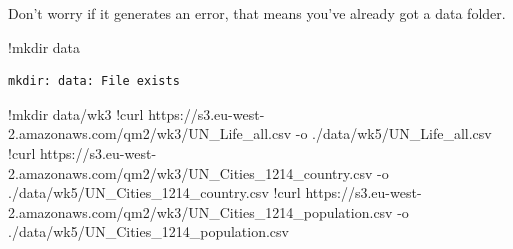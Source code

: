 \documentclass[
  letterpaper,
  DIV=11,
  numbers=noendperiod]{scrreprt}
\newenvironment{Shaded}{\begin{snugshade}}{\end{snugshade}}
\newcommand{\ErrorTok}[1]{\textcolor[rgb]{0.68,0.00,0.00}{#1}}
\newcommand{\FloatTok}[1]{\textcolor[rgb]{0.68,0.00,0.00}{#1}}
\newcommand{\NormalTok}[1]{\textcolor[rgb]{0.00,0.23,0.31}{#1}}
\newcommand{\OperatorTok}[1]{\textcolor[rgb]{0.37,0.37,0.37}{#1}}
\begin{document}
Don't worry if it generates an error, that means you've already got a
data folder.

\begin{Shaded}
\begin{Highlighting}[]
\OperatorTok{!}\NormalTok{mkdir data}
\end{Highlighting}
\end{Shaded}

\begin{verbatim}
mkdir: data: File exists
\end{verbatim}

\begin{Shaded}
\begin{Highlighting}[]
\OperatorTok{!}\NormalTok{mkdir data}\OperatorTok{/}\NormalTok{wk3}
\OperatorTok{!}\NormalTok{curl https:}\OperatorTok{//}\NormalTok{s3.eu}\OperatorTok{{-}}\NormalTok{west}\OperatorTok{{-}}\FloatTok{2.}\ErrorTok{amazonaws}\NormalTok{.com}\OperatorTok{/}\NormalTok{qm2}\OperatorTok{/}\NormalTok{wk3}\OperatorTok{/}\NormalTok{UN\_Life\_all.csv }\OperatorTok{{-}}\NormalTok{o .}\OperatorTok{/}\NormalTok{data}\OperatorTok{/}\NormalTok{wk5}\OperatorTok{/}\NormalTok{UN\_Life\_all.csv}
\OperatorTok{!}\NormalTok{curl https:}\OperatorTok{//}\NormalTok{s3.eu}\OperatorTok{{-}}\NormalTok{west}\OperatorTok{{-}}\FloatTok{2.}\ErrorTok{amazonaws}\NormalTok{.com}\OperatorTok{/}\NormalTok{qm2}\OperatorTok{/}\NormalTok{wk3}\OperatorTok{/}\NormalTok{UN\_Cities\_1214\_country.csv }\OperatorTok{{-}}\NormalTok{o .}\OperatorTok{/}\NormalTok{data}\OperatorTok{/}\NormalTok{wk5}\OperatorTok{/}\NormalTok{UN\_Cities\_1214\_country.csv}
\OperatorTok{!}\NormalTok{curl https:}\OperatorTok{//}\NormalTok{s3.eu}\OperatorTok{{-}}\NormalTok{west}\OperatorTok{{-}}\FloatTok{2.}\ErrorTok{amazonaws}\NormalTok{.com}\OperatorTok{/}\NormalTok{qm2}\OperatorTok{/}\NormalTok{wk3}\OperatorTok{/}\NormalTok{UN\_Cities\_1214\_population.csv }\OperatorTok{{-}}\NormalTok{o .}\OperatorTok{/}\NormalTok{data}\OperatorTok{/}\NormalTok{wk5}\OperatorTok{/}\NormalTok{UN\_Cities\_1214\_population.csv}
\end{Highlighting}
\end{Shaded}
\end{document}
